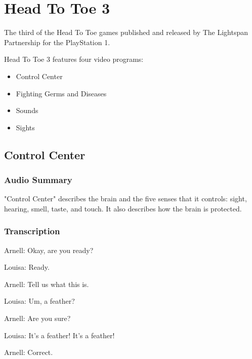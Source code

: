 \chapter{Head To Toe 3}


The third of the Head To Toe games published and released by The Lightspan Partnership for the PlayStation 1.

Head To Toe 3 features four video programs:

\begin{itemize}
    \item Control Center
    \item Fighting Germs and Diseases
    \item Sounds
    \item Sights
\end{itemize}

\clearpage
\newpage

\section{Control Center}

\subsection{Audio Summary}

"Control Center" describes the brain and the five senses that it controls: sight, hearing, smell, taste, and touch. It also describes how the brain is protected.

\subsection{Transcription}

Arnell: Okay, are you ready?

Louisa: Ready.

Arnell: Tell us what this is.

Louisa: Um, a feather?

Arnell: Are you sure?

Louisa: It's a feather! It's a feather!

Arnell: Correct.

